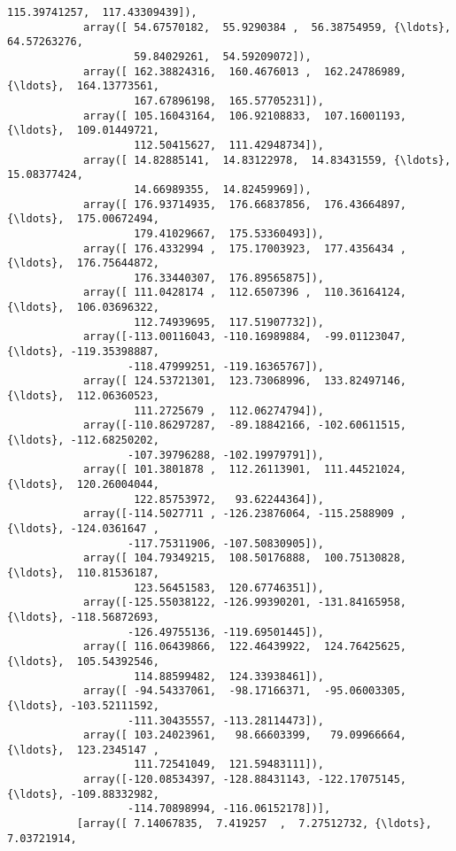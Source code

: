 \documentclass[11pt]{article}
\begin{document}
\begin{Verbatim}[commandchars=\\\{\}]
                    115.39741257,  117.43309439]),
            array([ 54.67570182,  55.9290384 ,  56.38754959, {\ldots},  64.57263276,
                    59.84029261,  54.59209072]),
            array([ 162.38824316,  160.4676013 ,  162.24786989, {\ldots},  164.13773561,
                    167.67896198,  165.57705231]),
            array([ 105.16043164,  106.92108833,  107.16001193, {\ldots},  109.01449721,
                    112.50415627,  111.42948734]),
            array([ 14.82885141,  14.83122978,  14.83431559, {\ldots},  15.08377424,
                    14.66989355,  14.82459969]),
            array([ 176.93714935,  176.66837856,  176.43664897, {\ldots},  175.00672494,
                    179.41029667,  175.53360493]),
            array([ 176.4332994 ,  175.17003923,  177.4356434 , {\ldots},  176.75644872,
                    176.33440307,  176.89565875]),
            array([ 111.0428174 ,  112.6507396 ,  110.36164124, {\ldots},  106.03696322,
                    112.74939695,  117.51907732]),
            array([-113.00116043, -110.16989884,  -99.01123047, {\ldots}, -119.35398887,
                   -118.47999251, -119.16365767]),
            array([ 124.53721301,  123.73068996,  133.82497146, {\ldots},  112.06360523,
                    111.2725679 ,  112.06274794]),
            array([-110.86297287,  -89.18842166, -102.60611515, {\ldots}, -112.68250202,
                   -107.39796288, -102.19979791]),
            array([ 101.3801878 ,  112.26113901,  111.44521024, {\ldots},  120.26004044,
                    122.85753972,   93.62244364]),
            array([-114.5027711 , -126.23876064, -115.2588909 , {\ldots}, -124.0361647 ,
                   -117.75311906, -107.50830905]),
            array([ 104.79349215,  108.50176888,  100.75130828, {\ldots},  110.81536187,
                    123.56451583,  120.67746351]),
            array([-125.55038122, -126.99390201, -131.84165958, {\ldots}, -118.56872693,
                   -126.49755136, -119.69501445]),
            array([ 116.06439866,  122.46439922,  124.76425625, {\ldots},  105.54392546,
                    114.88599482,  124.33938461]),
            array([ -94.54337061,  -98.17166371,  -95.06003305, {\ldots}, -103.52111592,
                   -111.30435557, -113.28114473]),
            array([ 103.24023961,   98.66603399,   79.09966664, {\ldots},  123.2345147 ,
                    111.72541049,  121.59483111]),
            array([-120.08534397, -128.88431143, -122.17075145, {\ldots}, -109.88332982,
                   -114.70898994, -116.06152178])],
           [array([ 7.14067835,  7.419257  ,  7.27512732, {\ldots},  7.03721914,

\end{Verbatim}
\end{document}
